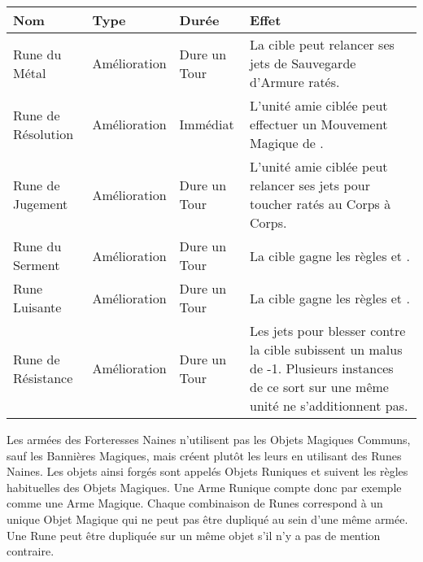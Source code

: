 \renewcommand{\arraystretch}{3.2}
\begin{tabular}{@{}>{\raggedright}m{3.7cm}M{2.2cm}M{2.2cm}m{7.8cm}@{}}
\textbf{Nom} &
\textbf{Type} &
\textbf{Durée} &
\centering\textbf{Effet}
\tabularnewline\hline

Rune du Métal &
Amélioration &
Dure un Tour &
La cible peut relancer ses jets de Sauvegarde d'Armure ratés.
\tabularnewline\hline

Rune de Résolution &
Amélioration &
Immédiat &
L'unité amie ciblée peut effectuer un Mouvement Magique de . 
\tabularnewline\hline

Rune de Jugement &
Amélioration &
Dure un Tour &
L'unité amie ciblée peut relancer ses jets pour toucher ratés au Corps à Corps.
\tabularnewline\hline

Rune du Serment &
Amélioration &
Dure un Tour &
La cible gagne les règles \stubborn{} et \immunetopsychology{}.
\tabularnewline\hline

Rune Luisante &
Amélioration &
Dure un Tour &
La cible gagne les règles \hardtarget{} et \distracting{}.
\tabularnewline\hline

Rune de Résistance &
Amélioration &
Dure un Tour &
Les jets pour blesser contre la cible subissent un malus de -1. Plusieurs instances de ce sort sur une même unité ne s'additionnent pas.
\tabularnewline

\end{tabular}
\renewcommand{\arraystretch}{1.2} %

\closearmynewsection




\subtitle{}

Les armées des Forteresses Naines n'utilisent pas les Objets Magiques Communs, sauf les Bannières Magiques, mais créent plutôt les leurs en utilisant des Runes Naines. Les objets ainsi forgés sont appelés Objets Runiques et suivent les règles habituelles des Objets Magiques. Une Arme Runique compte donc par exemple comme une Arme Magique. Chaque combinaison de Runes correspond à un unique Objet Magique qui ne peut pas être dupliqué au sein d'une même armée. Une Rune peut être dupliquée sur un même objet s'il n'y a pas de mention contraire.

